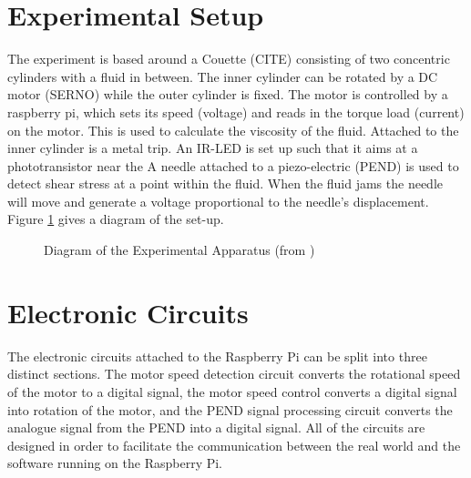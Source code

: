 \documentclass[a4]{report}
\begin{document}
	\section{Experimental Setup}
	The experiment is based around a Couette (CITE) consisting of two concentric cylinders with a fluid in between. The inner cylinder can be rotated by a DC motor (SERNO) while the outer cylinder is fixed. The motor is controlled by a raspberry pi, which sets its speed (voltage) and reads in the torque load (current) on the motor. This is used to calculate the viscosity of the fluid. Attached to the inner cylinder is a metal trip. An IR-LED is set up such that it aims at a phototransistor near the 
	A needle attached to a piezo-electric (PEND) is used to detect shear stress at a point within the fluid. When the fluid jams the needle will move and generate a voltage proportional to the needle's displacement. Figure \ref{expdia} gives a diagram of the set-up.\newline
	\begin{figure}[!htb]
	\centering
	\caption{Diagram of the Experimental Apparatus (from )}
	\label{expdia}
	\end{figure} \newline  \noindent



	\section{Electronic Circuits}
	The electronic circuits attached to the Raspberry Pi can be split into three distinct sections. The motor speed detection circuit converts the rotational speed of the motor to a digital signal, the motor speed control converts a digital signal into rotation of the motor, and the PEND signal processing circuit converts the analogue signal from the PEND into a digital signal. All of the circuits are designed in order to facilitate the communication between the real world and the software running on the Raspberry Pi. 
\end{document}
